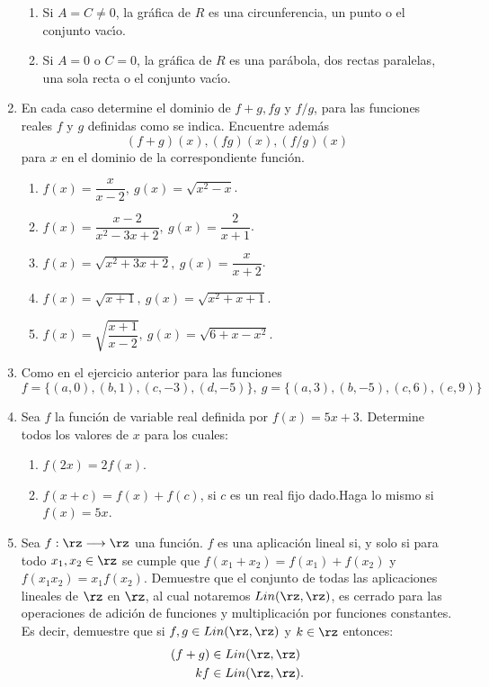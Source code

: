 \begin{enumerate}
\begin{enumerate}
\item Si $A=C\neq0$, la gr\'{a}fica de $R$ es una circunferencia, un punto o
el conjunto vac\'{\i}o.

\item Si $A=0$ o $C=0$, la gr\'{a}fica de $R$ es una par\'{a}bola, dos rectas
paralelas, una sola recta o el conjunto vac\'{\i}o.
\end{enumerate}

\item \label{ejercicio1} En cada caso determine el dominio de $f+g,fg$ y
$f/g$, para las funciones reales $f$ y $g$ definidas como se indica. Encuentre
adem\'{a}s
\[
(f+g)(x),(fg)(x),(f/g)(x)
\]
para $x$ en el dominio de la correspondiente funci\'{o}n.

\begin{enumerate}
\item $f(x)=\dfrac{x}{x-2},\ g(x)=\sqrt{x^{2}-x}$.

\item $f(x)=\dfrac{x-2}{x^{2}-3x+2},\ g(x)=\dfrac{2}{x+1}$.

\item $f(x)=\sqrt{x^{2}+3x+2},\ g(x)=\dfrac{x}{x+2}$.

\item $f(x)=\sqrt{x+1},\ g(x)=\sqrt{x^{2}+x+1}$.

\item $f(x)=\sqrt{\dfrac{x+1}{x-2}},\ g(x)=\sqrt{6+x-x^{2}}$.
\end{enumerate}

\item Como en el ejercicio anterior para las funciones
\[
f=\{(a,0),(b,1),(c,-3),(d,-5)\},\ g=\{(a,3),(b,-5),(c,6),(e,9)\}
\]


\item Sea $f$ la funci\'{o}n de variable real definida por $f(x)=5x+3$.
Determine todos los valores de $x$ para los cuales:

\begin{enumerate}
\item $f(2x)=2f(x)$.

\item $f(x+c)=f(x)+f(c)$, si $c$ es un real fijo dado.\newline Haga lo mismo
si $f(x)=5x$.
\end{enumerate}

\item Sea $f:\rz\longrightarrow\rz$ una funci\'{o}n. $f$ es una
%
aplicaci\'{o}n lineal si, y solo si para todo $x_{1},x_{2}\in\rz$ se cumple
que $f(x_{1}+x_{2})=f(x_{1})+f(x_{2})$ y $f(x_{1}x_{2})=x_{1}f(x_{2})$.
Demuestre que el conjunto de todas las aplicaciones lineales de $\rz$ en
$\rz$, al cual notaremos $Lin(\rz,\rz)$, es cerrado para las operaciones de
adici\'{o}n de funciones y multiplicaci\'{o}n por funciones constantes. Es
decir, demuestre que si $f,g\in Lin(\rz,\rz)$ y $k\in\rz$ entonces:
\begin{align*}
(f+g)  &  \in Lin(\rz,\rz)\\
kf  &  \in Lin(\rz,\rz).
\end{align*}



\end{enumerate}

